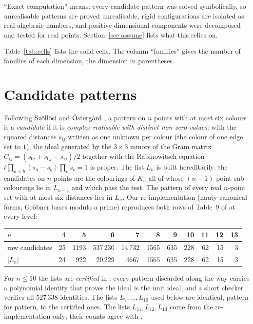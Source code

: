 \documentclass[11pt]{amsart}
\theoremstyle{remark}
\begin{document}
``Exact computation'' means: every candidate pattern was solved symbolically, so unrealisable patterns are
proved unrealisable, rigid configurations are isolated as real algebraic numbers, and positive-dimensional
components were decomposed and tested for real points. Section~\ref{sec:assume} lists what this relies on.

Table~\ref{tab:cells} lists the solid cells. The column ``families'' gives the number of families of each
dimension, the dimension in parentheses.



\section{Candidate patterns}\label{sec:patterns}

Following Szöllősi and Östergård \cite{SO}, a pattern on $n$ points with at most six colours is a
\emph{candidate} if it is \emph{complex-realisable with distinct non-zero values}: with the squared
distances $s_{ij}$ written as one unknown per colour (the colour of one edge set to $1$), the ideal generated
by the $3\times3$ minors of the Gram matrix $C_{ij}=(s_{0i}+s_{0j}-s_{ij})/2$ together with the Rabinowitsch
equation $t\prod_{a<b}(s_a-s_b)\prod_c s_c=1$ is proper. The list $L_n$ is built hereditarily: the
candidates on $n$ points are the colourings of $K_n$ all of whose $(n-1)$-point sub-colourings lie in
$L_{n-1}$ and which pass the test. The pattern of every real $n$-point set with at most six distances lies in
$L_n$. Our re-implementation (nauty canonical forms, Gröbner bases modulo a prime) reproduces both rows of
Table~9 of \cite{SO} at every level:

\begin{center}
\begin{tabular}{@{}lrrrrrrrrrr@{}}
\toprule
$n$ & 4 & 5 & 6 & 7 & 8 & 9 & 10 & 11 & 12 & 13\\
\midrule
raw candidates & 25 & 1193 & 537\,230 & 14\,732 & 1565 & 635 & 228 & 62 & 15 & 3\\
$|L_n|$ & 24 & 922 & 20\,229 & 4667 & 1565 & 635 & 228 & 62 & 15 & 3\\
\bottomrule
\end{tabular}
\end{center}

For $n\le10$ the lists are \emph{certified} in \cite[Sections~2--3]{AC}: every pattern discarded along the
way carries a polynomial identity that proves the ideal is the unit ideal, and a short checker verifies all
$527\,338$ identities. The lists $L_7,\dots,L_{10}$ used below are identical, pattern for pattern, to the
certified ones. The lists $L_{11},L_{12},L_{13}$ come from the re-implementation only; their counts agree
with \cite{SO}.
\end{document}
